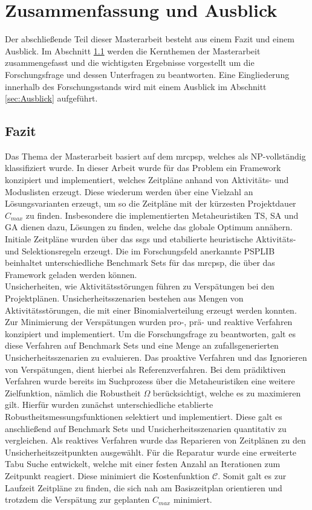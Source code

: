\chapter{Zusammenfassung und Ausblick} \label{ch:Zusammenfassung}
Der abschließende Teil dieser Masterarbeit besteht aus einem Fazit und einem Ausblick. Im Abschnitt \ref{sec:Fazit} werden die Kernthemen der Masterarbeit zusammengefasst und die wichtigsten Ergebnisse vorgestellt um die Forschungsfrage und dessen Unterfragen zu beantworten. Eine Eingliederung innerhalb des Forschungsstands wird mit einem Ausblick im Abschnitt \ref{sec:Ausblick} aufgeführt.

\section{Fazit} \label{sec:Fazit}

Das Thema der Masterarbeit basiert auf dem \ac{mrcpsp}, welches als NP-vollständig klassifiziert wurde. In dieser Arbeit wurde für das Problem ein Framework konzipiert und implementiert, welches Zeitpläne anhand von Aktivitäts- und Moduslisten erzeugt. Diese wiederum werden über eine Vielzahl an Lösungsvarianten erzeugt, um so die Zeitpläne mit der kürzesten Projektdauer $C_{max}$ zu finden. Insbesondere die implementierten Metaheuristiken \acl{TS}, \acl{SA} und \acl{GA} dienen dazu, Lösungen zu finden, welche das globale Optimum annähern. Initiale Zeitpläne wurden über das \ac{ssgs} und etabilierte heuristische Aktivitäts- und Selektionsregeln erzeugt. Die im Forschungsfeld anerkannte PSPLIB beinhaltet unterschiedliche Benchmark Sets für das \ac{mrcpsp}, die über das Framework geladen werden können. \\

Unsicherheiten, wie Aktivitätsstörungen führen zu Verspätungen bei den Projektplänen. Unsicherheitsszenarien bestehen aus Mengen von Aktivitätsstörungen, die mit einer Binomialverteilung erzeugt werden konnten. Zur Minimierung der Verspätungen wurden pro-, prä- und reaktive Verfahren konzipiert und implementiert. Um die Forschungsfrage zu beantworten, galt es diese Verfahren auf Benchmark Sets und eine Menge an zufallsgenerierten Unsicherheitsszenarien zu evaluieren. Das proaktive Verfahren und das Ignorieren von Verspätungen, dient hierbei als Referenzverfahren. Bei dem prädiktiven Verfahren wurde bereits im Suchprozess über die Metaheuristiken eine weitere Zielfunktion, nämlich die Robustheit $\Omega$ berücksichtigt, welche es zu maximieren gilt. Hierfür wurden zunächst unterschiedliche etablierte Robustheitsmessungsfunktionen selektiert und implementiert. Diese galt es anschließend auf Benchmark Sets und Unsicherheitsszenarien quantitativ zu vergleichen. Als reaktives Verfahren wurde das Reparieren von Zeitplänen zu den Unsicherheitszeitpunkten ausgewählt. Für die Reparatur wurde eine erweiterte Tabu Suche entwickelt, welche mit einer festen Anzahl an Iterationen zum Zeitpunkt reagiert. Diese minimiert die Kostenfunktion $\mathcal{C}$. Somit galt es zur Laufzeit Zeitpläne zu finden, die sich nah am Basiszeitplan orientieren und trotzdem die Verspätung zur geplanten $C_{max}$ minimiert. \\

